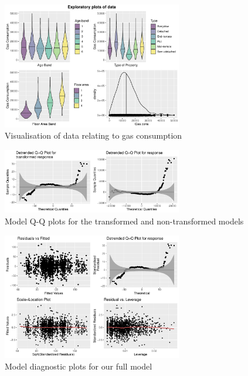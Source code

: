 \documentclass[8pt]{extarticle}
\begin{document}
\begin{figure}[H]
	\centering
	\includegraphics[width=0.7\textwidth]{datavis}
	\caption{Visualisation of data relating to gas consumption}
	\label{fig:datavis}
\end{figure}


\begin{figure}[H]
	\centering
	\includegraphics[width=0.7\textwidth]{qqplots}
	\caption{Model Q-Q plots for the transformed and non-transformed models}
	\label{fig:qqplots}
\end{figure}

\begin{figure}[H]
	\centering
	\includegraphics[width=0.7\textwidth]{fm_diag}
	\caption{Model diagnostic plots for our full model}
	\label{fig:fmdiag}
\end{figure}
\end{document}
